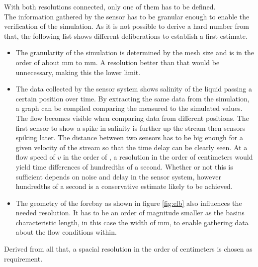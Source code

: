 With both resolutions connected, only one of them has to be defined. \\

The information gathered by the sensor has to be granular enough to enable the verification of the simulation. As it is not possible to derive a hard number from that, the following list shows different deliberations to establish a first estimate. \\

\begin{itemize}
\item The granularity of the simulation is determined by the mesh size and is in the order of about  \unit[1]{mm} to \unit[5]{mm}. A resolution better than that would be unnecessary, making this the lower limit.

\item The data collected by the sensor system shows salinity of the liquid passing a certain position over time. By extracting the same data from the simulation, a graph can be compiled comparing the measured to the simulated values. The flow becomes visible when comparing data from different positions. The first sensor to show a spike in salinity is further up the stream then sensors spiking later. The distance between two sensors has to be big enough for a given velocity of the stream so that the time delay can be clearly seen. At a flow speed of $ v $ in the order of , a resolution in the order of centimeters would yield time differences of hundredths of a second. Whether or not this is sufficient depends on noise and delay in the sensor system, however hundredths of a second is a conservative estimate likely to be achieved.

\item The geometry of the forebay as shown in figure \ref{fig:elb} also influences the needed resolution. It has to be an order of magnitude smaller as the basins characteristic length, in this case the width of \unit[850]{mm}, to enable gathering data about the flow conditions within.
\end{itemize}

Derived from all that, a spacial resolution in the order of centimeters is chosen as requirement.

